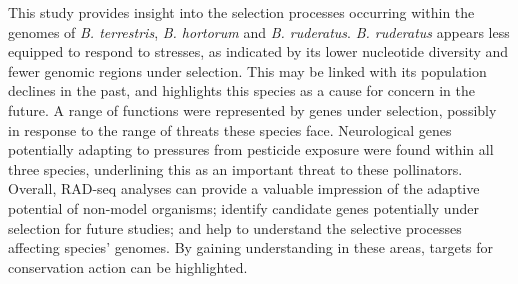 \documentclass[12pt]{article}
\begin{document}
\begin{linenumbers}
	This study provides insight into the selection processes occurring within the genomes of \emph{B. terrestris}, \emph{B. hortorum} and \emph{B. ruderatus}. \emph{B. ruderatus} appears less equipped to respond to stresses, as indicated by its lower nucleotide diversity and fewer genomic regions under selection. This may be linked with its population declines in the past, and highlights this species as a cause for concern in the future. A range of functions were represented by genes under selection, possibly in response to the range of threats these species face.
	Neurological genes potentially adapting to pressures from pesticide exposure were found within all three species, underlining this as an important threat to these pollinators. Overall, RAD-seq analyses can provide a valuable impression of the adaptive potential of non-model organisms; identify candidate genes potentially under selection for future studies; and help to understand the selective processes affecting species' genomes. By gaining understanding in these areas, targets for conservation action can be highlighted.
		
    	
    \newpage




		

\end{linenumbers}
\end{document}
